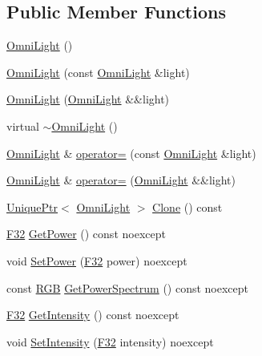 \subsection*{Public Member Functions}
\begin{DoxyCompactItemize}
\item 
\hyperlink{classmage_1_1_omni_light_a993394b31cdddcf37018cd5ff09d2d99}{Omni\+Light} ()
\item 
\hyperlink{classmage_1_1_omni_light_accf10bcdf8ed523cfb04129f5345ef92}{Omni\+Light} (const \hyperlink{classmage_1_1_omni_light}{Omni\+Light} \&light)
\item 
\hyperlink{classmage_1_1_omni_light_ae0353cedc67d88be2f4b88374482933d}{Omni\+Light} (\hyperlink{classmage_1_1_omni_light}{Omni\+Light} \&\&light)
\item 
virtual \hyperlink{classmage_1_1_omni_light_af6f4921499b430041966f38aac920b69}{$\sim$\+Omni\+Light} ()
\item 
\hyperlink{classmage_1_1_omni_light}{Omni\+Light} \& \hyperlink{classmage_1_1_omni_light_a7bdce151d327daef5e1f31daedcc4627}{operator=} (const \hyperlink{classmage_1_1_omni_light}{Omni\+Light} \&light)
\item 
\hyperlink{classmage_1_1_omni_light}{Omni\+Light} \& \hyperlink{classmage_1_1_omni_light_a287a54dede61e65efe4493ec20531428}{operator=} (\hyperlink{classmage_1_1_omni_light}{Omni\+Light} \&\&light)
\item 
\hyperlink{namespacemage_a3316d7143a973e37adf1110f2e80ca31}{Unique\+Ptr}$<$ \hyperlink{classmage_1_1_omni_light}{Omni\+Light} $>$ \hyperlink{classmage_1_1_omni_light_a82325924de65733314dcf2b87e926d60}{Clone} () const
\item 
\hyperlink{namespacemage_aa97e833b45f06d60a0a9c4fc22ae02c0}{F32} \hyperlink{classmage_1_1_omni_light_a13f9893ef0a19cbb08bfce557bb906fc}{Get\+Power} () const noexcept
\item 
void \hyperlink{classmage_1_1_omni_light_a03f277ecf566147aa54c95816871de10}{Set\+Power} (\hyperlink{namespacemage_aa97e833b45f06d60a0a9c4fc22ae02c0}{F32} power) noexcept
\item 
const \hyperlink{structmage_1_1_r_g_b}{R\+GB} \hyperlink{classmage_1_1_omni_light_a17a0de3d22bfd3dcb2480f516009d885}{Get\+Power\+Spectrum} () const noexcept
\item 
\hyperlink{namespacemage_aa97e833b45f06d60a0a9c4fc22ae02c0}{F32} \hyperlink{classmage_1_1_omni_light_ae7309fdbe54b5d6bc6d4e20990ba6bdc}{Get\+Intensity} () const noexcept
\item 
void \hyperlink{classmage_1_1_omni_light_add3fece8f288f4d4b55357143faa490b}{Set\+Intensity} (\hyperlink{namespacemage_aa97e833b45f06d60a0a9c4fc22ae02c0}{F32} intensity) noexcept

\end{DoxyCompactItemize}
